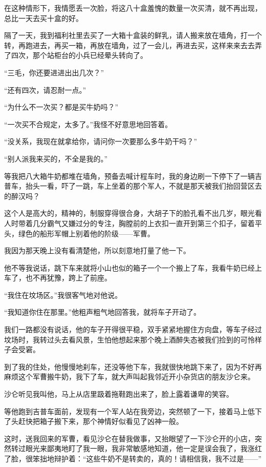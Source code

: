 \par 在这种情形下，我情愿丢一次脸，将这八十盒羞愧的数量一次买清，就不再出现，总比一天去买十盒的好。
\par 隔了一天，我到福利社里去买了一大箱十盒装的鲜乳，请人搬来放在墙角，打一个转，再跑进去，再买一箱，再放在墙角，过了一会儿，再进去买，这样来来去去弄了四次，那个站柜台的小兵已经晕头转向了。
\par “三毛，你还要进进出出几次？”
\par “还有四次，请忍耐一点。”
\par “为什么不一次买？都是买牛奶吗？”
\par “一次买不合规定，太多了。”我怪不好意思地回答着。
\par “没关系，我现在就拿给你，请问你一次要那么多牛奶干吗？”
\par “别人派我来买的，不全是我的。”
\par 等我把八大箱牛奶都堆在墙角，预备去喊计程车时，我的身边刷一下停下了一辆吉普车，抬头一看，吓了一跳，车上坐着的那个军人，不就是那天被我们抬回营区去的醉汉吗？
\par 这个人是高大的，精神的，制服穿得很合身，大胡子下的脸孔看不出几岁，眼光看人时带着几分霸气又嫌过分的专注，胸膛前的上衣扣一直开到第三个扣子，留着平头，绿色的船形军帽上别着他的阶级——军曹。
\par 我因为那天晚上没有看清楚他，所以刻意地打量了他一下。
\par 他不等我说话，跳下车来就将小山也似的箱子一个一个搬上了车，我看牛奶已经上车了，也不再犹豫，跨上了前座。
\par “我住在坟场区。”我很客气地对他说。
\par “我知道你住在那里。”他粗声粗气地回答我，就将车子开动了。
\par 我们一路都没有说话，他的车子开得很平稳，双手紧紧地握住方向盘，等车子经过坟场时，我转过头去看风景，生怕他想起来那个晚上酒醉失态被我们捡到的可怜样子会受窘。
\par 到了我的住处，他慢慢地刹车，还没等他下车，我就很快地跳下来了，因为不好再麻烦这个军曹搬牛奶，我下了车，就大声叫起我邻近开小杂货店的朋友沙仑来。
\par 沙仑听见我叫他，马上从店里趿着拖鞋跑出来了，脸上露着谦卑的笑容。
\par 等他跑到吉普车面前，发现有一个军人站在我旁边，突然顿了一下，接着马上低下了头赶快把箱子搬下来，那个神情好似看见了凶神一般。
\par 这时，送我回来的军曹，看见沙仑在替我做事，又抬眼望了一下沙仑开的小店，突然转过眼光来鄙夷地盯了我一眼，我非常敏感地知道，他一定是误会我了，我涨红了脸，很笨拙地辩护着：“这些牛奶不是转卖的，真的！请相信我，我不过是——”
